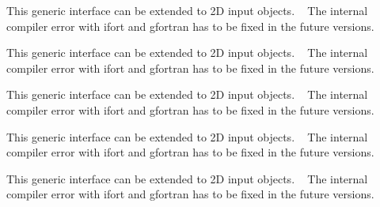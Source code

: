 
\begin{DoxyRefList}
\item[Type \mbox{\hyperlink{interfaceArrayFind__mod_1_1genReplaced}{Array\+Find\+\_\+mod\+::gen\+Replaced}} ]\label{todo__todo000001}%
%
 This generic interface can be extended to 2D input objects. ~\newline
 The internal compiler error with {\ttfamily ifort} and {\ttfamily gfortran} has to be fixed in the future versions. ~\newline
 
\item[Type \mbox{\hyperlink{interfaceArrayFind__mod_1_1getReplaced}{Array\+Find\+\_\+mod\+::get\+Replaced}} ]\label{todo__todo000002}%
%
 This generic interface can be extended to 2D input objects. ~\newline
 The internal compiler error with {\ttfamily ifort} and {\ttfamily gfortran} has to be fixed in the future versions. ~\newline
 
\item[Type \mbox{\hyperlink{interfaceArrayReplace__mod_1_1genReplaced}{Array\+Replace\+\_\+mod\+::gen\+Replaced}} ]\label{todo__todo000003}%
%
 This generic interface can be extended to 2D input objects. ~\newline
 The internal compiler error with {\ttfamily ifort} and {\ttfamily gfortran} has to be fixed in the future versions. ~\newline
 
\item[Type \mbox{\hyperlink{interfaceArrayReplace__mod_1_1getReplaced}{Array\+Replace\+\_\+mod\+::get\+Replaced}} ]\label{todo__todo000004}%
%
 This generic interface can be extended to 2D input objects. ~\newline
 The internal compiler error with {\ttfamily ifort} and {\ttfamily gfortran} has to be fixed in the future versions. ~\newline
 
\item[Type \mbox{\hyperlink{interfaceArrayUnique__mod_1_1genUnique}{Array\+Unique\+\_\+mod\+::gen\+Unique}} ]\label{todo__todo000005}%
%
 This generic interface can be extended to 2D input objects. ~\newline
 The internal compiler error with {\ttfamily ifort} and {\ttfamily gfortran} has to be fixed in the future versions. ~\newline
 

\end{DoxyRefList}
